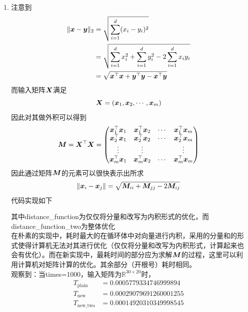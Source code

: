 \documentclass[answers]{exam}  %
\begin{document}
\begin{questions}
	\begin{solution}
		\begin{enumerate}
            \item 注意到
            \[
                \begin{aligned}
                    \|{\boldsymbol{x}} - \boldsymbol{y}\|_2&=\sqrt{\sum_{i=1}^{d} (x_i - y_i)^2}\\
                    &=\sqrt{\sum^d_{i=1}x_i^2+\sum^d_{i=1}y_i^2-2\sum^d_{i=1}x_iy_i}\\
                    &=\sqrt{{\boldsymbol{x}}^\top{\boldsymbol{x}}+\boldsymbol{y}^\top\boldsymbol{y}-{\boldsymbol{x}}^\top\boldsymbol{y}}
                \end{aligned}  
            \]
            而输入矩阵$\boldsymbol{X}$满足
            \[\boldsymbol{X}=({\boldsymbol{x}}_1,{\boldsymbol{x}}_2,\cdots,{\boldsymbol{x}}_m)\]
            因此对其做外积可以得到
            \[
                \boldsymbol{M}=\boldsymbol{X}^\top\boldsymbol{X}=\left(
                    \begin{matrix}
                        {\boldsymbol{x}}^\top_1{\boldsymbol{x}}_1&{\boldsymbol{x}}_1^\top{\boldsymbol{x}}_2&\cdots&{\boldsymbol{x}}^\top_1{\boldsymbol{x}}_m\\
                        {\boldsymbol{x}}^\top_2{\boldsymbol{x}}_1&{\boldsymbol{x}}_2^\top{\boldsymbol{x}}_2&\cdots&{\boldsymbol{x}}^\top_2{\boldsymbol{x}}_m\\
                        \vdots&\vdots& &\vdots\\ 
                        {\boldsymbol{x}}^\top_m{\boldsymbol{x}}_1&{\boldsymbol{x}}_m^\top{\boldsymbol{x}}_2&\cdots&{\boldsymbol{x}}^\top_m{\boldsymbol{x}}_m\\
                    \end{matrix}
                \right) 
            \]
            因此通过矩阵$\boldsymbol{M}$的元素可以很快表示出所求
            \[\|{\boldsymbol{x}}_i-{\boldsymbol{x}}_j\|=\sqrt{\boldsymbol{M}_{ii}+\boldsymbol{M}_{jj}-2\boldsymbol{M}_{ij}}\]
            代码实现如下
            
            其中distance\_function为仅仅将分量和改写为内积形式的优化，而distance\_function\_two为整体优化\\
            在朴素的实现中，耗时最大的在循环体中对向量进行内积，采用的分量和的形式使得计算机无法对其进行优化（仅仅将分量和改写为内积形式，计算起来也会有优化）。而在新实现中，最耗时间的部分应为求解$\boldsymbol{M}$的过程，这里可以利用计算机对矩阵计算的优化。其余部分（开根号）耗时相同。\\
            观察到：当times=1000，输入矩阵为$\mathbb{R}^{30\times 20}$时，
            \[
                    \begin{aligned}
                        T_{\text{plain}}   &=0.0005779334746999894\\
                        T_{\text{new}}     &=0.00029079691260001255\\
                        T_{\text{new\_two}}&=0.00014920310349998545

\end{aligned}\]
\end{enumerate}
\end{solution}
\end{questions}
\end{document}
